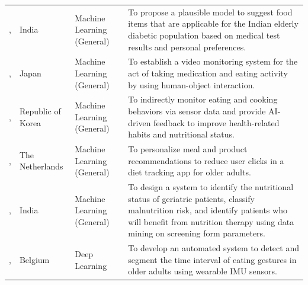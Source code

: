 \begin{longtable}{p{}p{}p{}p{}}
    \addlinespace
    \citeauthor{rameshNovelRulebasedRecommender2021}, \citeyear{rameshNovelRulebasedRecommender2021}                                   & India             & Machine Learning (General)        & To propose a plausible model to suggest food items that are applicable for the Indian elderly diabetic population based on medical test results and personal preferences.                                                              \\
    \addlinespace
    \citeauthor{seintMedicationMealIntake2018}, \citeyear{seintMedicationMealIntake2018}                                               & Japan             & Machine Learning (General)        & To establish a video monitoring system for the act of taking medication and eating activity by using human-object interaction.                                                                                                         \\
    \addlinespace
    \citeauthor{seokFeasibilityEfficacyTouchCare2022}, \citeyear{seokFeasibilityEfficacyTouchCare2022}                                 & Republic of Korea & Machine Learning (General)        & To indirectly monitor eating and cooking behaviors via sensor data and provide AI-driven feedback to improve health-related habits and nutritional status.                                                                             \\
    \addlinespace
    \citeauthor{spoorenImprovingRecommendationsMeals2023}, \citeyear{spoorenImprovingRecommendationsMeals2023}                         & The Netherlands   & Machine Learning (General)        & To personalize meal and product recommendations to reduce user clicks in a diet tracking app for older adults.                                                                                                                         \\
    \addlinespace
    \citeauthor{suryawanshiMalnutritionIdentificationGeriatric2021}, \citeyear{suryawanshiMalnutritionIdentificationGeriatric2021}     & India             & Machine Learning (General)        & To design a system to identify the nutritional status of geriatric patients, classify malnutrition risk, and identify patients who will benefit from nutrition therapy using data mining on screening form parameters.                 \\
    \addlinespace
    \citeauthor{wangDetectionEatingGestures2024}, \citeyear{wangDetectionEatingGestures2024}                                           & Belgium           & Deep Learning                     & To develop an automated system to detect and segment the time interval of eating gestures in older adults using wearable IMU sensors.                                                                                                  \\

\end{longtable}
